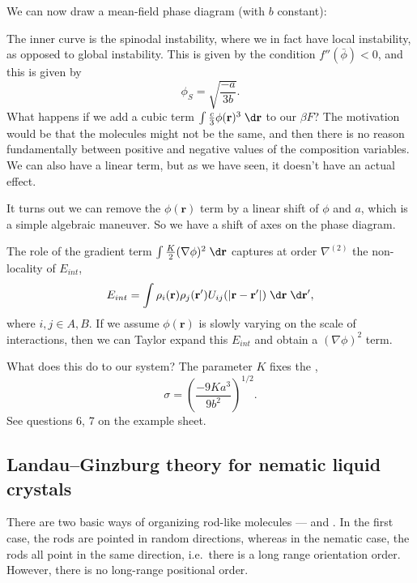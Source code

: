 \documentclass[a4paper]{article}
\begin{document}
We can now draw a mean-field phase diagram (with $b$ constant):
\begin{center}
\end{center}
The inner curve is the spinodal instability, where we in fact have local instability, as opposed to global instability. This is given by the condition $f''(\bar{\phi}) < 0$, and this is given by
\[
  \phi_S = \sqrt{\frac{-a}{3b}}.
\]
What happens if we add a cubic term $\int \frac{c}{3} \phi(\mathbf{r})^3 \;\d \mathbf{r}$ to our $\beta F$? The motivation would be that the molecules might not be the same, and then there is no reason fundamentally between positive and negative values of the composition variables. We can also have a linear term, but as we have seen, it doesn't have an actual effect.

It turns out we can remove the $\phi(\mathbf{r})$ term by a linear shift of $\phi$ and $a$, which is a simple algebraic maneuver. So we have a shift of axes on the phase diagram.

The role of the gradient term $\int \frac{K}{2} (\nabla \phi)^2 \;\d \mathbf{r}$ captures at order $\nabla^{(2)}$ the non-locality of $E_{int}$,
\[
  E_{int} = \int \rho_i (\mathbf{r}) \rho_j(\mathbf{r}') U_{ij}(|\mathbf{r} - \mathbf{r}'|)\;\d \mathbf{r}\;\d \mathbf{r}',
\]
where $i, j \in A, B$. If we assume $\phi(\mathbf{r})$ is slowly varying on the scale of interactions, then we can Taylor expand this $E_{int}$ and obtain a $(\nabla \phi)^2$ term.

What does this do to our system? The parameter $K$ fixes the ,
\[
  \sigma = \left(\frac{-9 K a^3}{9 b^2}\right)^{1/2}.
\]
See questions 6, 7 on the example sheet.

\subsection{Landau--Ginzburg theory for nematic liquid crystals}
There are two basic ways of organizing rod-like molecules ---  and . In the first case, the rods are pointed in random directions, whereas in the nematic case, the rods all point in the same direction, i.e.\ there is a long range orientation order. However, there is no long-range positional order.
\end{document}
